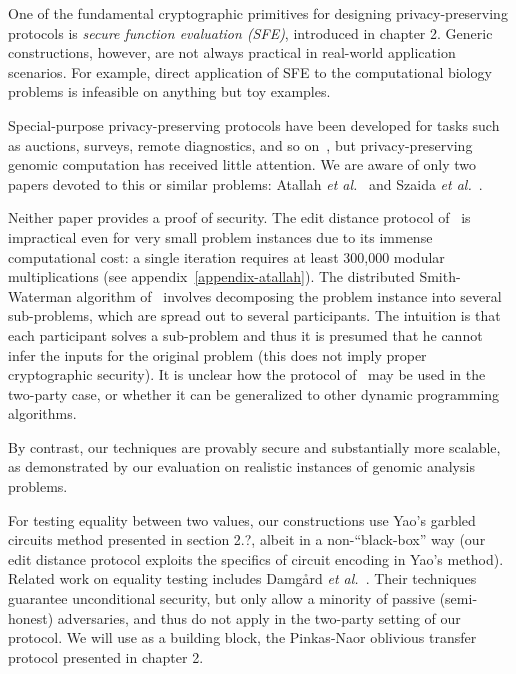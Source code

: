 One of the fundamental cryptographic primitives for designing
privacy-preserving protocols is \emph{secure function evaluation (SFE)},
introduced in chapter 2.  Generic constructions, however, are not always
practical in real-world
application scenarios.  For example, direct application of SFE to the
computational biology problems is infeasible on anything but toy examples.

Special-purpose privacy-preserving protocols have been developed
for tasks such as auctions, surveys, remote diagnostics, and so
on~\cite{FPRS04,FNP04,LP02,NPS99,BPS07}, but privacy-preserving
genomic computation has received little attention.  We are aware of
only two papers devoted to this or similar problems: Atallah \textit{et
al.}~\cite{atallah} and Szaida \textit{et al.}~\cite{Szajda:NDSS:2004}.

Neither paper provides a proof of security.  The edit distance protocol
of~\cite{atallah} is impractical even for very small problem instances due
to its immense computational cost: a single iteration requires at least
300,000 modular multiplications (see appendix~\ref{appendix-atallah}).
The distributed Smith-Waterman algorithm of~\cite{Szajda:NDSS:2004}
involves decomposing the problem instance into several sub-problems,
which are spread out to several participants.  The intuition is that
each participant solves a sub-problem and thus it is presumed that
he cannot infer the inputs for the original problem (this does not
imply proper cryptographic security).  It is unclear how the protocol
of~\cite{Szajda:NDSS:2004} may be used in the two-party case, or whether
it can be generalized to other dynamic programming algorithms.

By contrast, our techniques are provably secure and substantially more
scalable, as demonstrated by our evaluation on realistic instances of
genomic analysis problems.

For testing equality between two values, our constructions use
Yao's garbled circuits method presented in section 2.?, albeit in
a non-``black-box'' way (our edit distance protocol exploits the
specifics of circuit encoding in Yao's method).  Related work on
equality testing includes Damg{\aa}rd \textit{et al.}~\cite{Dam-TCC06}.
Their techniques guarantee unconditional security, but only allow a
minority of passive (semi-honest) adversaries, and thus do not apply in
the two-party setting of our protocol.  We will use as a building
block, the Pinkas-Naor oblivious transfer protocol presented
in chapter 2.
